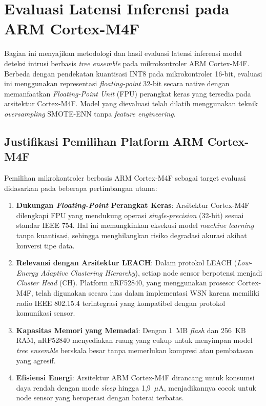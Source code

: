 
\section{Evaluasi Latensi Inferensi pada ARM Cortex-M4F}

Bagian ini menyajikan metodologi dan hasil evaluasi latensi inferensi model deteksi intrusi berbasis \textit{tree ensemble} pada mikrokontroler ARM Cortex-M4F. Berbeda dengan pendekatan kuantisasi INT8 pada mikrokontroler 16-bit, evaluasi ini menggunakan representasi \textit{floating-point} 32-bit secara native dengan memanfaatkan \textit{Floating-Point Unit} (FPU) perangkat keras yang tersedia pada arsitektur Cortex-M4F. Model yang dievaluasi telah dilatih menggunakan teknik \textit{oversampling} SMOTE-ENN tanpa \textit{feature engineering}.

\subsection{Justifikasi Pemilihan Platform ARM Cortex-M4F}

Pemilihan mikrokontroler berbasis ARM Cortex-M4F sebagai target evaluasi didasarkan pada beberapa pertimbangan utama:

\begin{enumerate}
    \item \textbf{Dukungan \textit{Floating-Point} Perangkat Keras}: Arsitektur Cortex-M4F dilengkapi FPU yang mendukung operasi \textit{single-precision} (32-bit) sesuai standar IEEE 754. Hal ini memungkinkan eksekusi model \textit{machine learning} tanpa kuantisasi, sehingga menghilangkan risiko degradasi akurasi akibat konversi tipe data.

    \item \textbf{Relevansi dengan Arsitektur LEACH}: Dalam protokol LEACH (\textit{Low-Energy Adaptive Clustering Hierarchy}), setiap node sensor berpotensi menjadi \textit{Cluster Head} (CH). Platform nRF52840, yang menggunakan prosesor Cortex-M4F, telah digunakan secara luas dalam implementasi WSN karena memiliki radio IEEE 802.15.4 terintegrasi yang kompatibel dengan protokol komunikasi sensor.

    \item \textbf{Kapasitas Memori yang Memadai}: Dengan 1~MB \textit{flash} dan 256~KB RAM, nRF52840 menyediakan ruang yang cukup untuk menyimpan model \textit{tree ensemble} berskala besar tanpa memerlukan kompresi atau pembatasan yang agresif.

    \item \textbf{Efisiensi Energi}: Arsitektur ARM Cortex-M4F dirancang untuk konsumsi daya rendah dengan mode \textit{sleep} hingga 1,9~$\mu$A, menjadikannya cocok untuk node sensor yang beroperasi dengan baterai terbatas.
\end{enumerate}

